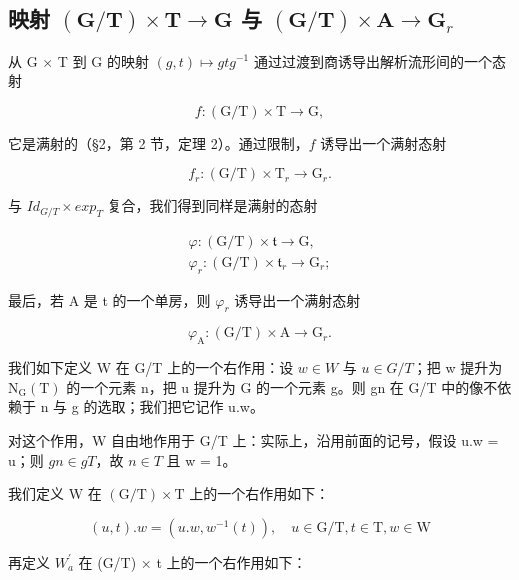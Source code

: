 \subsection{\texorpdfstring{映射 \((\mathbf{G} / \mathbf{T})\times \mathbf{T}\to \mathbf{G}\) 与 \((\mathbf{G} / \mathbf{T})\times \mathbf{A}\rightarrow \mathbf{G}_r\)}{映射 (\textbackslash mathbf\{G\} / \textbackslash mathbf\{T\})\textbackslash times \textbackslash mathbf\{T\}\textbackslash to \textbackslash mathbf\{G\} 与 (\textbackslash mathbf\{G\} / \textbackslash mathbf\{T\})\textbackslash times \textbackslash mathbf\{A\}\textbackslash rightarrow \textbackslash mathbf\{G\}\_r}}

从 G × T 到 G 的映射 \((g,t)\mapsto gtg^{-1}\) 通过过渡到商诱导出解析流形间的一个态射

\[
f: (\mathrm{G} / \mathrm{T}) \times \mathrm{T} \to \mathrm{G},
\]

它是满射的（§2，第 2 节，定理 2）。通过限制，\(f\) 诱导出一个满射态射

\[
f _ {r}: (\mathrm{G} / \mathrm{T}) \times \mathrm{T} _ {r} \rightarrow \mathrm{G} _ {r}.
\]

与 \(Id_{G/T} \times exp_{T}\) 复合，我们得到同样是满射的态射

\[
\begin{array}{c} \varphi : (\mathrm{G/T}) \times \mathfrak {t} \to \mathrm{G}, \\ \varphi_ {r}: (\mathrm{G/T}) \times \mathfrak {t} _ {r} \to \mathrm{G} _ {r}; \end{array}
\]

最后，若 A 是 t 的一个单房，则 \(\varphi_{r}\) 诱导出一个满射态射

\[
\varphi_ {\mathrm{A}}: (\mathrm{G/T}) \times \mathrm{A} \to \mathrm{G} _ {r}.
\]

我们如下定义 W 在 G/T 上的一个右作用：设 \(w \in W\) 与 \(u \in G/T\)；把 w 提升为 \(\mathrm{N}_{\mathrm{G}}(\mathrm{T})\) 的一个元素 n，把 u 提升为 G 的一个元素 g。则 gn 在 G/T 中的像不依赖于 n 与 g 的选取；我们把它记作 u.w。

对这个作用，W 自由地作用于 G/T 上：实际上，沿用前面的记号，假设 u.w = u；则 \(gn \in gT\)，故 \(n \in T\) 且 w = 1。

我们定义 W 在 \((\mathrm{G}/\mathrm{T}) \times \mathrm{T}\) 上的一个右作用如下：

\[
(u, t). w = (u. w, w ^ {- 1} (t)), \quad u \in \mathrm{G} / \mathrm{T}, t \in \mathrm{T}, w \in \mathrm{W}
\]

再定义 \(W_{a}^{\prime}\) 在 (G/T) × t 上的一个右作用如下：

